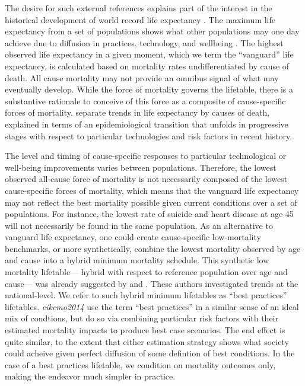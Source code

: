 \documentclass[11pt,oneside,a4paper]{article} %
\begin{document}
The desire for such external references explains part of the interest in the
historical development of world record life expectancy \citep{oeppen2002broken}.
The maximum life expectancy from a set of populations shows what other
populations may one day achieve due to diffusion in practices, technology, and
wellbeing \citep{vallin2010esperance}. The highest observed life expectancy in
a given moment, which we term the ``vanguard'' life expectancy, is calculated
based on mortality rates undifferentiated by cause of death. All cause mortality may not provide an omnibus signal of what may eventually develop. While the force of mortality governs the lifetable, there is a substantive rationale to conceive of
this force as a composite of cause-specific forces of mortality.
\citet{vallin2008minimum} separate trends in life expectancy by causes of death,
explained in terms of an epidemiological transition that unfolds in progressive
stages with respect to particular technologies and risk factors in recent
history. 

The level and timing of cause-specific responses to particular
technological or well-being improvements varies between populations. Therefore,
the lowest observed all-cause force of mortality is not necessarily composed of
the lowest cause-specific forces of mortality, which means that the vanguard life
expectancy may not reflect the best mortality possible given current conditions
over a set of populations. For instance, the lowest rate of suicide and heart
disease at age 45 will not necessarily be found in the same population. As an
alternative to vanguard life expectancy, one could create cause-specific
low-mortality benchmarks, or more synthetically, combine the lowest mortality
observed by age and cause into a hybrid minimum mortality schedule. This synthetic low mortality lifetable--- hybrid with respect to reference population over age and cause--- was already suggested by \citet{wunsch1975minimum} and \citet{vallin2008minimum}. These authors investigated trends at the national-level. We refer to such hybrid minimum
lifetables as ``best practices'' lifetables. \textit{eikemo2014} use the term
``best practices'' in a similar sense of an ideal mix of condtions, but do so via
combining particular risk factors with their estimated mortality impacts to
produce best case scenarios. The end effect is quite similar, to the extent that
either estimation strategy shows what society could acheive given perfect
diffusion of some defintion of best conditions. In the case of a best practices
lifetable, we condition on mortality outcomes only, making the endeavor much
simpler in practice.
\end{document}
